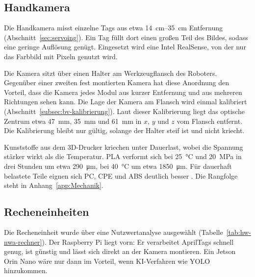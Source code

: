 \subsection{Handkamera}
\label{subsec:hw-handkamera}
Die Handkamera misst einzelne Tags aus etwa \SIrange{14}{35}{\centi\metre} Entfernung (Abschnitt~\ref{sec:servoing}). Ein Tag füllt dort einen großen Teil des Bildes, sodass eine geringe Auflösung genügt. Eingesetzt wird eine Intel RealSense, von der nur das Farbbild mit  Pixeln genutzt wird. 

Die Kamera sitzt über einen Halter am Werkzeugflansch des Roboters. Gegenüber einer zweiten fest montierten Kamera hat diese Anordnung den Vorteil, dass die Kamera jedes Modul aus kurzer Entfernung und aus mehreren Richtungen sehen kann. Die Lage der Kamera am Flansch wird einmal kalibriert (Abschnitt~\ref{subsec:bv-kalibrierung}). Laut dieser Kalibrierung liegt das optische Zentrum etwa \SI{47}{\milli\metre}, \SI{35}{\milli\metre} und \SI{61}{\milli\metre} in $x$, $y$ und $z$ vom Flansch entfernt. Die Kalibrierung bleibt nur gültig, solange der Halter steif ist und nicht kriecht. 

Kunststoffe aus dem 3D-Drucker kriechen unter Dauerlast, wobei die Spannung stärker wirkt als die Temperatur. PLA verformt sich bei \SI{25}{\degreeCelsius} und \SI{20}{\mega\pascal} in drei Stunden um etwa \SI{290}{\micro\metre}, bei \SI{40}{\degreeCelsius} um etwa \SI{1850}{\micro\metre}. Für dauerhaft belastete Teile eignen sich PC, CPE und ABS deutlich besser . Die Rangfolge steht in Anhang~\ref{app:Mechanik}. 

\subsection{Recheneinheiten}
\label{subsec:hw-rechner}
Die Recheneinheit wurde über eine Nutzwertanalyse ausgewählt (Tabelle~\ref{tab:hw-nwa-rechner}). Der Raspberry Pi liegt vorn: Er verarbeitet AprilTags schnell genug, ist günstig und lässt sich direkt an der Kamera montieren. Ein Jetson Orin Nano wäre nur dann im Vorteil, wenn KI-Verfahren wie YOLO hinzukommen.

